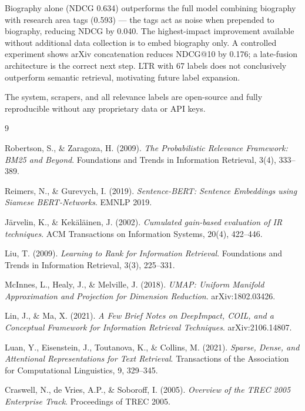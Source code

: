 \documentclass[11pt,a4paper]{article}
\begin{document}
Biography alone (NDCG 0.634) outperforms the full model combining biography
with research area tags (0.593) --- the tags act as noise when prepended to
biography, reducing NDCG by 0.040. The highest-impact improvement available
without additional data collection is to embed biography only.
A controlled experiment shows arXiv concatenation reduces NDCG@10 by 0.176;
a late-fusion architecture is the correct next step.
LTR with 67 labels does not conclusively outperform semantic retrieval,
motivating future label expansion.

The system, scrapers, and all relevance labels are open-source and
fully reproducible without any proprietary data or API keys.

\begin{thebibliography}{9}

Robertson, S., \& Zaragoza, H. (2009).
\textit{The Probabilistic Relevance Framework: BM25 and Beyond}.
Foundations and Trends in Information Retrieval, 3(4), 333--389.

Reimers, N., \& Gurevych, I. (2019).
\textit{Sentence-BERT: Sentence Embeddings using Siamese BERT-Networks}.
EMNLP 2019.

J{\"a}rvelin, K., \& Kek{\"a}l{\"a}inen, J. (2002).
\textit{Cumulated gain-based evaluation of IR techniques}.
ACM Transactions on Information Systems, 20(4), 422--446.

Liu, T. (2009).
\textit{Learning to Rank for Information Retrieval}.
Foundations and Trends in Information Retrieval, 3(3), 225--331.

McInnes, L., Healy, J., \& Melville, J. (2018).
\textit{UMAP: Uniform Manifold Approximation and Projection for Dimension
Reduction}. arXiv:1802.03426.

Lin, J., \& Ma, X. (2021).
\textit{A Few Brief Notes on DeepImpact, COIL, and a Conceptual Framework
for Information Retrieval Techniques}.
arXiv:2106.14807.

Luan, Y., Eisenstein, J., Toutanova, K., \& Collins, M. (2021).
\textit{Sparse, Dense, and Attentional Representations for Text Retrieval}.
Transactions of the Association for Computational Linguistics, 9, 329--345.

Craswell, N., de Vries, A.P., \& Soboroff, I. (2005).
\textit{Overview of the TREC 2005 Enterprise Track}.
Proceedings of TREC 2005.


\end{thebibliography}
\end{document}
